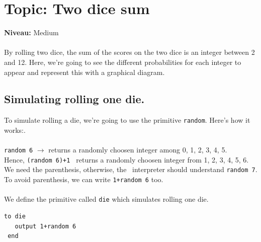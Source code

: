 \chapter{Topic: Two dice sum}
{ }\hfill\textbf{Niveau:} Medium\\ \\
By rolling two dice, the sum of the scores on the two dice is an integer between  2 and 12. Here, we're going to see the different probabilities for each integer to appear and represent this with a graphical diagram.
\section{Simulating rolling one die.}
\noindent To simulate rolling a die, we're going to use the primitive \texttt{random}. Here's how it works:.\\ \\
\texttt{random 6} $\longrightarrow$ returns a randomly choosen integer  among 0, 1, 2, 3, 4, 5.\\
Hence, \texttt{(random 6)+1 } returns a randomly choosen integer from 1, 2, 3, 4, 5, 6. We need the parenthesis, otherwise, the \logo\ interpreter should understand \texttt{random 7}. To avoid parenthesis, we can write \texttt{1+random~6} too.\\ \\
We define the primitive called \texttt{die} which simulates rolling one die.
\begin{verbatim}
to die
   output 1+random 6
 end
\end{verbatim}
